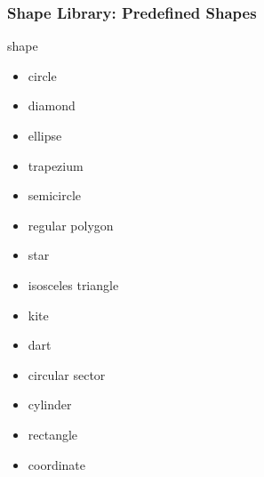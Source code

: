 \documentclass[ aspectratio=169,  12pt,blue,xcolor=pdftex,dvipsnames,table,handout,notes]{beamer}
\begin{document}

		\begin{frame}[plain]

			\centering
			\scalebox{4}{Shape Library}
	
		\end{frame}



		\begin{frame}[t]
		\frametitle{Shape Library: Predefined Shapes}

			\begin{block}{shape}
			\begin{itemize}
			\item[] 	circle
			\item[] 	diamond
			\item[] 	ellipse
			\item[] 	trapezium
			\item[] 	semicircle
			\item[] 	regular polygon
			\item[] 	star
			\item[] 	isosceles triangle
			\item[] 	kite
			\item[] 	dart
			\item[] 	circular sector
			\item[] 	cylinder
			\item[] 	rectangle
			\item[] 	coordinate
			\end{itemize}
			\end{block}


\end{frame}
\end{document}

